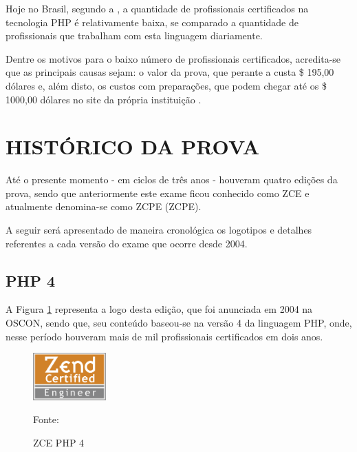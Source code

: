 Hoje no Brasil, segundo a , a 
quantidade de profissionais certificados na tecnologia PHP é relativamente 
baixa, se comparado a quantidade de profissionais que trabalham com esta 
linguagem diariamente.

Dentre os motivos para o baixo número de profissionais certificados, acredita-se
que as principais causas sejam: o valor da prova, que perante a 
 custa \$ 195,00 dólares e, além disto, 
os custos com preparações, que podem chegar até os \$ 1000,00 dólares no site da 
própria instituição \cite{websiteZendOnlineTraining}.

\section{HISTÓRICO DA PROVA}

Até o presente momento - em ciclos de três anos - houveram quatro edições da
prova, sendo que anteriormente este exame ficou conhecido como \ac{ZCE} e
atualmente denomina-se como \acl{ZCPE} (\acs{ZCPE}).

A seguir será apresentado de maneira cronológica os logotipos e detalhes
referentes a cada versão do exame que ocorre desde 2004.

\subsection{PHP 4}

A Figura \ref{fig:logoCertificationPHP4} representa a logo desta edição, que
foi anunciada em 2004 na \ac{OSCON}, sendo que, seu conteúdo baseou-se na versão
4 da linguagem \acs{PHP}, onde, nesse período houveram mais de mil profissionais 
certificados em dois anos.

\begin{figure}[h!tb]
	\caption{ZCE PHP 4}
	\label{fig:logoCertificationPHP4}

	\centering
	\includegraphics[width=0.25\textwidth]{images/logo/php4.png}

	\centering
	\footnotesize Fonte: 
\end{figure}

\FloatBarrier 	%

